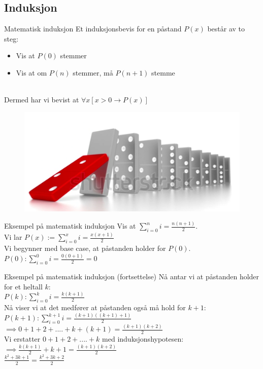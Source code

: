 \subsection{Induksjon}
\begin{frame}{Matematisk induksjon}
    Et induksjonsbevis for en påstand $P(x)$ består av to steg:\\
    \begin{itemize}
        \item Vis at $P(0)$ stemmer
        \item Vis at om $P(n)$ stemmer, må $P(n+1)$ stemme
    \end{itemize}\\
    Dermed har vi bevist at $\forall x [ x > 0 \rightarrow P(x)]$
    
    \begin{figure}
        \centering
        \includegraphics[scale=0.1]{domino.PNG}
        \label{fig:my_label}
    \end{figure}
\end{frame}

\begin{frame}{Eksempel på matematisk induksjon}
    Vis at $\sum_{i=0}^{n} i = \frac{n(n+1)}{2}$.\\
    
    Vi lar $P(x) := \sum_{i=0}^{x} i = \frac{x(x+1)}{2}$\\
    Vi begynner med base case, at påstanden holder for $P(0)$.\\
    $P(0): \sum_{i=0}^{0} i = \frac{0(0+1)}{2} = 0$ \checkmark\\
\end{frame}

\begin{frame}{Eksempel på matematisk induksjon (fortsettelse)}
     Nå antar vi at påstanden holder for et heltall $k$: \\
    $P(k): \sum_{i=0}^{k} i = \frac{k(k+1)}{2}$\\
    Nå viser vi at det medfører at påstanden også må hold for $k+1$:\\
    $P(k+1): \sum_{i=0}^{k+1} i = \frac{(k+1)((k+1)+1)}{2}$\\
    $\implies 0 + 1 + 2 + .... + k + (k+1) = \frac{(k+1)(k+2)}{2}$\\
    
    Vi erstatter $0 + 1 + 2 + .... + k$ med induksjonshypotesen:\\
    $\implies \frac{k(k+1)}{2} + k + 1 = \frac{(k+1)(k+2)}{2}$\\
    $\frac{k^2 + 3k + 1}{2} = \frac{k^2+3k+2}{2}$ \checkmark
\end{frame}

